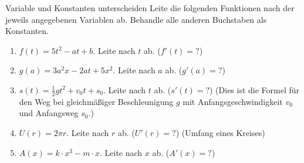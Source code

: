 \begin{aufgabenumgebung}{Variable und Konstanten unterscheiden}
Leite die folgenden Funktionen nach der jeweils angegebenen Variablen ab. Behandle alle anderen Buchstaben als Konstanten.
\begin{enumerate}
    \item $f(t) = 5t^2 - at + b$. Leite nach $t$ ab. ($f'(t) = ?$)
    \item $g(a) = 3a^2x - 2at + 5x^2$. Leite nach $a$ ab. ($g'(a) = ?$)
    \item $s(t) = \frac{1}{2}gt^2 + v_0 t + s_0$. Leite nach $t$ ab. ($s'(t) = ?$) (Dies ist die Formel für den Weg bei gleichmäßiger Beschleunigung $g$ mit Anfangsgeschwindigkeit $v_0$ und Anfangsweg $s_0$.)
    \item $U(r) = 2\pi r$. Leite nach $r$ ab. ($U'(r) = ?$) (Umfang eines Kreises)
    \item $A(x) = k \cdot x^3 - m \cdot x$. Leite nach $x$ ab. ($A'(x) = ?$)
\end{enumerate}
\end{aufgabenumgebung}


